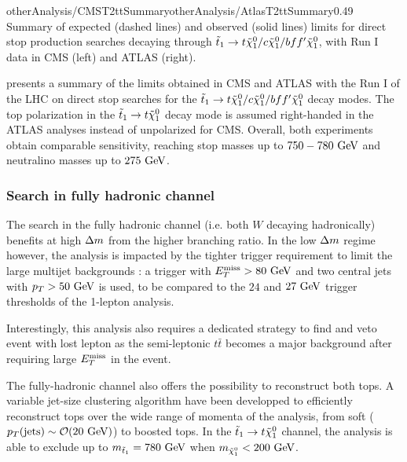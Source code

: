                     {otherAnalysis/CMST2ttSummary}{otherAnalysis/AtlasT2ttSummary}{0.49}
    {Summary of expected (dashed lines) and observed (solid lines) limits for direct stop
    production searches decaying through $\tilde{t}_1 \rightarrow t \tilde{\chi}_1^0 / c \tilde{\chi}_1^0 / b ff' \tilde{\chi}_1^0$,
    with Run I data in CMS (left) and ATLAS (right).}

     presents a summary of the limits obtained in CMS and ATLAS
    with the Run I of the LHC on direct stop searches for the $\tilde{t}_1 \rightarrow t \tilde{\chi}_1^0 / c \tilde{\chi}_1^0 / b ff' \tilde{\chi}_1^0$
    decay modes. The top polarization in the $\tilde{t}_1 \rightarrow t \tilde{\chi}_1^0$ decay mode
    is assumed right-handed in the ATLAS analyses instead of unpolarized for CMS. Overall,
    both experiments obtain comparable sensitivity, reaching stop masses up to $750-780~\text{GeV}$
    and neutralino masses up to $275~\text{GeV}$.

    \subsubsection{Search in fully hadronic channel}

    The search in the fully hadronic channel (i.e. both $W$ decaying hadronically) benefits
    at high $\Delta m$ from the higher branching ratio. In the low $\Delta m$ regime however,
    the analysis is impacted by the tighter trigger requirement to limit the large multijet
    backgrounds : a trigger with $E_T^\text{miss} > 80~\text{GeV}$ and two central jets with $p_T > 50~\text{GeV}$
    is used, to be compared to the $24$ and $27~\text{GeV}$ trigger thresholds of the 1-lepton
    analysis.

    Interestingly, this analysis also requires a dedicated strategy to find and veto
    event with lost lepton as the semi-leptonic $t\bar{t}$ becomes a major background
    after requiring large $E_T^\text{miss}$ in the event.

    The fully-hadronic channel also offers the possibility to reconstruct both tops. A
    variable jet-size clustering algorithm have been developped to efficiently reconstruct
    tops over the wide range of momenta of the analysis, from soft ($p_T(\text{jets}) \sim
    \mathcal{O}(20~\text{GeV})$) to boosted tops.
    In the $\tilde{t}_1 \rightarrow t \tilde{\chi}_1^0$ channel, the analysis is able to exclude
    up to $m_{\tilde{t}_1} = 780~\text{GeV}$ when $m_{\tilde{\chi}_1^0} < 200~\text{GeV}$. 

